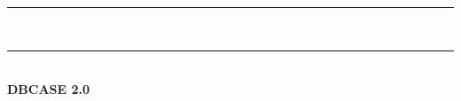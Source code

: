 %
%
% 
%




\thispagestyle{empty}
\vspace*{9mm}
\begin{center}
    \rule[0.5ex]{\linewidth}{2pt}\vspace*{-\baselineskip}\vspace*{4.2pt}\\
    \rule[0.5ex]{\linewidth}{1pt}\\
    [3.1mm]
    {\textbf{\LARGE{DBCASE 2.0}} }\\[3mm] %
    

\end{center}
